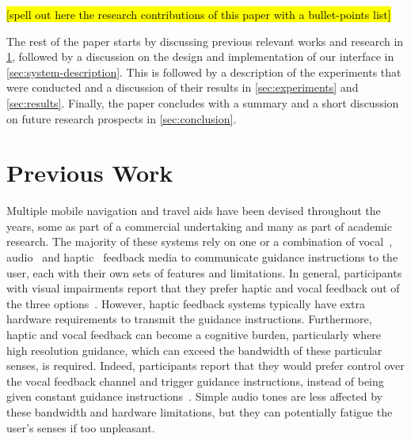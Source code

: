 \documentclass{article}
\DeclareRobustCommand{\tofix}[1]{{\sethlcolor{yellow}\hl{[#1]}}}
\begin{document}
\tofix{spell out here the research contributions of this paper with a bullet-points list}

The rest of the paper starts by discussing previous relevant works and research in \cref{sec:prev-work}, followed by a discussion on the design and implementation of our interface in \cref{sec:system-description}.
This is followed by a description of the experiments that were conducted and a discussion of their results in \cref{sec:experiments} and \cref{sec:results}.
Finally, the paper concludes with a summary and a short discussion on future research prospects in \cref{sec:conclusion}.

\section{Previous Work}\label{sec:prev-work}

Multiple mobile navigation and travel aids have been devised throughout the years, some as part of a commercial undertaking and many as part of academic research.
The majority of these systems rely on one or a combination of vocal~\cite{mocanu2016when,chessa2016integrated,kanwal2015navigation}, audio~\cite{schwarze2015intuitive,rodriguez2012obstacle,katz2010navig} and haptic~\cite{rivera-rubio2015assistive,lee2015rgb,xiao2015assistive} feedback media to communicate guidance instructions to the user, each with their own sets of features and limitations.
In general, participants with visual impairments report that they prefer haptic and vocal feedback out of the three options~\cite{arditi2013user}.
However, haptic feedback systems typically have extra hardware requirements to transmit the guidance instructions.
Furthermore, haptic and vocal feedback can become a cognitive burden, particularly where high resolution guidance, which can exceed the bandwidth of these particular senses, is required.
Indeed, participants report that they would prefer control over the vocal feedback channel and trigger guidance instructions, instead of being given constant guidance instructions~\cite{arditi2013user}.
Simple audio tones are less affected by these bandwidth and hardware limitations, but they can potentially fatigue the user's senses if too unpleasant.
\end{document}
